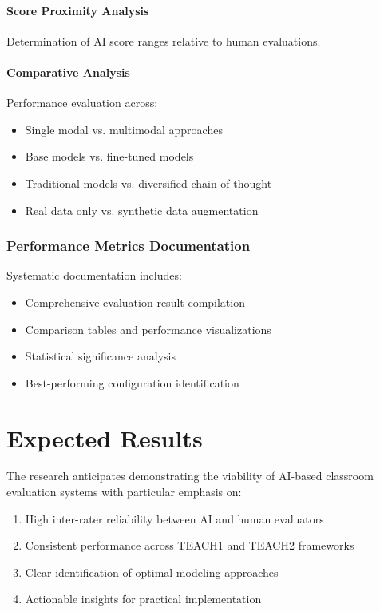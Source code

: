 \documentclass[12pt]{article}
\begin{document}
\paragraph{Score Proximity Analysis} Determination of AI score ranges relative to human evaluations.

\paragraph{Comparative Analysis} Performance evaluation across:
\begin{itemize}
    \item Single modal vs. multimodal approaches
    \item Base models vs. fine-tuned models  
    \item Traditional models vs. diversified chain of thought
    \item Real data only vs. synthetic data augmentation
\end{itemize}

\subsubsection{Performance Metrics Documentation}
Systematic documentation includes:
\begin{itemize}
    \item Comprehensive evaluation result compilation
    \item Comparison tables and performance visualizations
    \item Statistical significance analysis
    \item Best-performing configuration identification
\end{itemize}

\section{Expected Results}

The research anticipates demonstrating the viability of AI-based classroom evaluation systems with particular emphasis on:
\begin{enumerate}
    \item High inter-rater reliability between AI and human evaluators
    \item Consistent performance across TEACH1 and TEACH2 frameworks
    \item Clear identification of optimal modeling approaches
    \item Actionable insights for practical implementation
\end{enumerate}
\end{document}
